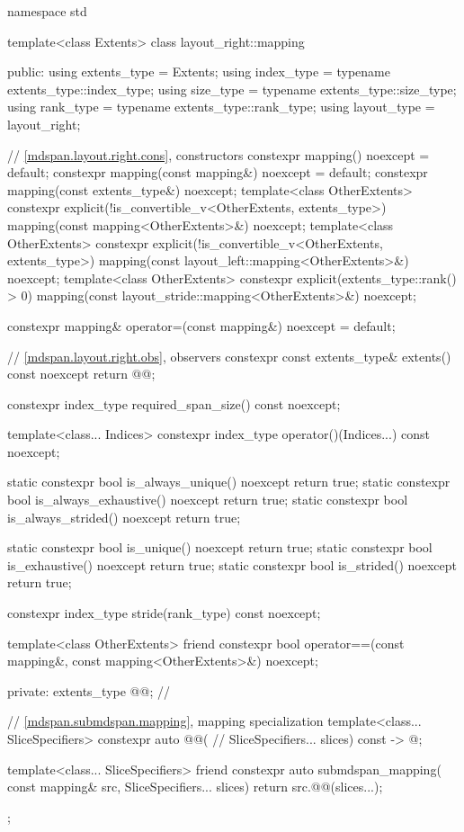 \begin{codeblock}
namespace std {
  template<class Extents>
  class layout_right::mapping {
  public:
    using extents_type = Extents;
    using index_type = typename extents_type::index_type;
    using size_type = typename extents_type::size_type;
    using rank_type = typename extents_type::rank_type;
    using layout_type = layout_right;

    // \ref{mdspan.layout.right.cons}, constructors
    constexpr mapping() noexcept = default;
    constexpr mapping(const mapping&) noexcept = default;
    constexpr mapping(const extents_type&) noexcept;
    template<class OtherExtents>
      constexpr explicit(!is_convertible_v<OtherExtents, extents_type>)
        mapping(const mapping<OtherExtents>&) noexcept;
    template<class OtherExtents>
      constexpr explicit(!is_convertible_v<OtherExtents, extents_type>)
        mapping(const layout_left::mapping<OtherExtents>&) noexcept;
    template<class OtherExtents>
      constexpr explicit(extents_type::rank() > 0)
        mapping(const layout_stride::mapping<OtherExtents>&) noexcept;

    constexpr mapping& operator=(const mapping&) noexcept = default;

    // \ref{mdspan.layout.right.obs}, observers
    constexpr const extents_type& extents() const noexcept { return @@; }

    constexpr index_type required_span_size() const noexcept;

    template<class... Indices>
      constexpr index_type operator()(Indices...) const noexcept;

    static constexpr bool is_always_unique() noexcept { return true; }
    static constexpr bool is_always_exhaustive() noexcept { return true; }
    static constexpr bool is_always_strided() noexcept { return true; }

    static constexpr bool is_unique() noexcept { return true; }
    static constexpr bool is_exhaustive() noexcept { return true; }
    static constexpr bool is_strided() noexcept { return true; }

    constexpr index_type stride(rank_type) const noexcept;

    template<class OtherExtents>
      friend constexpr bool operator==(const mapping&, const mapping<OtherExtents>&) noexcept;

  private:
    extents_type @@{};    // \expos

    // \ref{mdspan.submdspan.mapping},  mapping specialization
    template<class... SliceSpecifiers>
      constexpr auto @@(                    // \expos
        SliceSpecifiers... slices) const -> @\seebelow@;

    template<class... SliceSpecifiers>
      friend constexpr auto submdspan_mapping(
        const mapping& src, SliceSpecifiers... slices) {
          return src.@@(slices...);
      }
  };
}
\end{codeblock}


